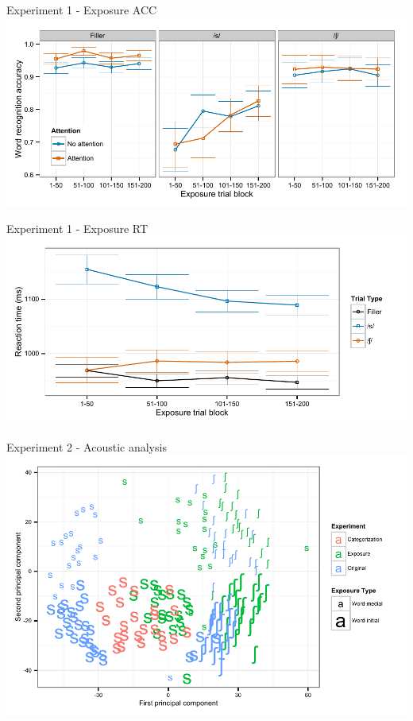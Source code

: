 \documentclass{beamer}
\begin{document}
\begin{frame}{Experiment 1 - Exposure ACC}
\includegraphics[width=1.0\textwidth]{graphs/exp1_expacc}
\end{frame}

\begin{frame}{Experiment 1 - Exposure RT}
\includegraphics[width=1.0\textwidth]{graphs/exp1_exprt}
\end{frame}

\begin{frame}{Experiment 2 - Acoustic analysis}
\includegraphics[width=1.0\textwidth]{graphs/exp2_mds}
\end{frame}
\end{document}
